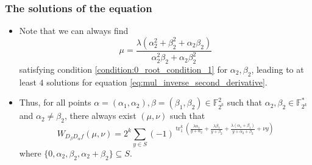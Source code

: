 \documentclass[
    aspectratio=169,                   %
]{beamer}
\newcommand{\Fks}{\mathbb{F}_{2^k}^*}
\newcommand{\Fk}{\mathbb{F}_{2^k}}
\newcommand{\tr}{\operatorname{tr}_1^k}
\begin{document}
    \begin{frame}
        \frametitle{The solutions of the equation}
    
        \begin{itemize}
            \item Note that we can always find 
            \[ \mu=\frac{\lambda(\alpha_2^2+\beta_2^2+\alpha_2\beta_2)}{\alpha_2^2\beta_2+\alpha_2\beta_2^2} \] 
            satisfying condition \eqref{condition:0_root_condition_1} for $ \alpha_2,\beta_2 $, leading to at least $ 4 $ solutions 
            for equation \eqref{eq:mul_inverse_second_derivative}. 
            
            \item Thus, for all points $ \alpha=(\alpha_1,\alpha_2),\beta=(\beta_1,\beta_2)\in\Fk^2 $ such that $ \alpha_2,\beta_2\in\Fks $ 
            and $ \alpha_2\ne\beta_2 $, there always exist $ (\mu,\nu) $ such that 
            \[W_{D_{\beta}D_{\alpha}f}(\mu,\nu) = 2^k\sum_{y\in S}(-1)^{\tr\left(\frac{\lambda\alpha_1}{y+\alpha_2}+\frac{\lambda\beta_1}{y+\beta_2}+\frac{\lambda(\alpha_1+\beta_1)}{y+\alpha_2+\beta_2}+\nu y\right)}\]
            where $ \{0,\alpha_2,\beta_2,\alpha_2+\beta_2\}\subseteq S $.
        \end{itemize}

    
    \end{frame}
\end{document}
